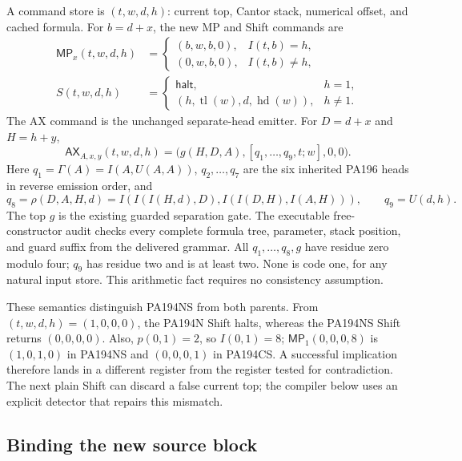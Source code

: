 A command store is $(t,w,d,h)$: current top, Cantor stack, numerical offset,
and cached formula. For $b=d+x$, the new MP and Shift commands are
\begin{align}
 \mathsf{MP}_x(t,w,d,h)&=
 \begin{cases}
 (b,w,b,0),&I(t,b)=h,\\
 (0,w,b,0),&I(t,b)\ne h,
 \end{cases}\label{eq:ns-mp}\\
 S(t,w,d,h)&=
 \begin{cases}
 \mathsf{halt},&h=1,\\
 (h,\operatorname{tl}(w),d,\operatorname{hd}(w)),&h\ne1.
 \end{cases}\label{eq:ns-shift}
\end{align}
The AX command is the unchanged separate-head emitter. For
$D=d+x$ and $H=h+y$,
\begin{equation}
 \mathsf{AX}_{A,x,y}(t,w,d,h)
 =\bigl(g(H,D,A),[q_1,\ldots,q_9,t;w],0,0\bigr).
 \label{eq:ns-ax}
\end{equation}
Here $q_1=\Gamma(A)=I(A,U(A,A))$, $q_2,\ldots,q_7$ are the
six inherited PA196 heads in reverse emission order, and
\[
 q_8=\rho(D,A,H,d)=I(I(I(H,d),D),I(I(D,H),I(A,H))),
 \qquad q_9=U(d,h).
\]
The top $g$ is the existing guarded separation gate. The executable
free-constructor audit checks every complete formula tree, parameter,
stack position, and guard suffix from the delivered grammar. All
$q_1,\ldots,q_8,g$ have residue zero modulo four; $q_9$ has residue two
and is at least two. None is code one, for any natural input store.
This arithmetic fact requires no consistency assumption.

These semantics distinguish PA194NS from both parents. From
$(t,w,d,h)=(1,0,0,0)$, the PA194N Shift halts, whereas the PA194NS Shift
returns $(0,0,0,0)$. Also, $p(0,1)=2$, so $I(0,1)=8$;
$\mathsf{MP}_1(0,0,0,8)$ is $(1,0,1,0)$ in PA194NS and
$(0,0,0,1)$ in PA194CS. A successful implication therefore lands in a
different register from the register tested for contradiction. The next
plain Shift can discard a false current top; the compiler below uses an
explicit detector that repairs this mismatch.

\subsection{Binding the new source block}

